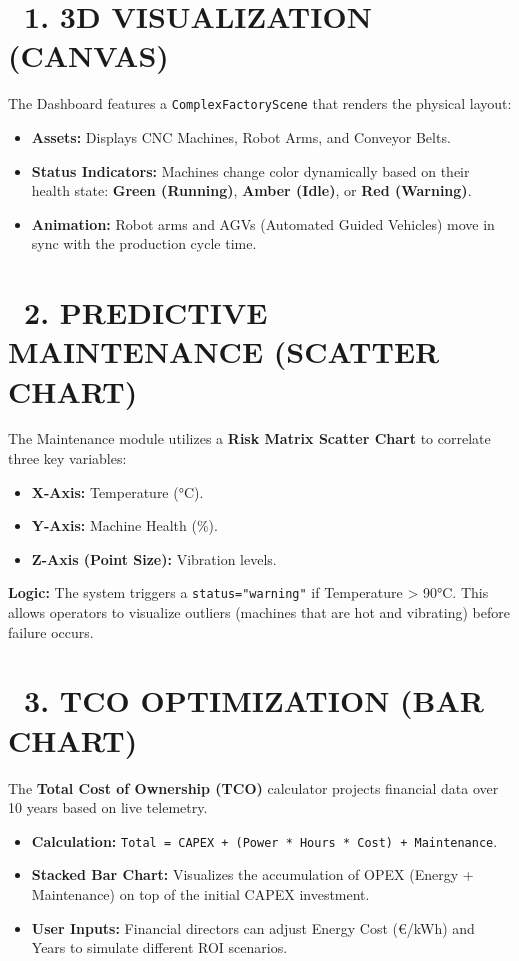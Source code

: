 \documentclass[11pt,a4paper]{article}
\begin{document}
\vspace{0.5cm}

\section*{\faDesktop\ 1. 3D VISUALIZATION (CANVAS)}
The Dashboard features a \texttt{ComplexFactoryScene} that renders the physical layout:
\begin{itemize}
    \item \textbf{Assets:} Displays CNC Machines, Robot Arms, and Conveyor Belts.
    \item \textbf{Status Indicators:} Machines change color dynamically based on their health state: 
    \textcolor{BrandSuccess}{\textbf{Green (Running)}}, \textcolor{BrandWarning}{\textbf{Amber (Idle)}}, or \textcolor{BrandDanger}{\textbf{Red (Warning)}}.
    \item \textbf{Animation:} Robot arms and AGVs (Automated Guided Vehicles) move in sync with the production cycle time.
\end{itemize}

\vspace{0.5cm}

\section*{\faChartLine\ 2. PREDICTIVE MAINTENANCE (SCATTER CHART)}
The Maintenance module utilizes a \textbf{Risk Matrix Scatter Chart} to correlate three key variables:
\begin{itemize}
    \item \textbf{X-Axis:} Temperature (°C).
    \item \textbf{Y-Axis:} Machine Health (\%).
    \item \textbf{Z-Axis (Point Size):} Vibration levels.
\end{itemize}
\textbf{Logic:} The system triggers a \texttt{status="warning"} if Temperature > 90°C. This allows operators to visualize outliers (machines that are hot and vibrating) before failure occurs.

\vspace{0.5cm}

\section*{\faCalculator\ 3. TCO OPTIMIZATION (BAR CHART)}
The \textbf{Total Cost of Ownership (TCO)} calculator projects financial data over 10 years based on live telemetry.
\begin{itemize}
    \item \textbf{Calculation:} \texttt{Total = CAPEX + (Power * Hours * Cost) + Maintenance}.
    \item \textbf{Stacked Bar Chart:} Visualizes the accumulation of OPEX (Energy + Maintenance) on top of the initial CAPEX investment.
    \item \textbf{User Inputs:} Financial directors can adjust Energy Cost (€/kWh) and Years to simulate different ROI scenarios.
\end{itemize}
\end{document}
